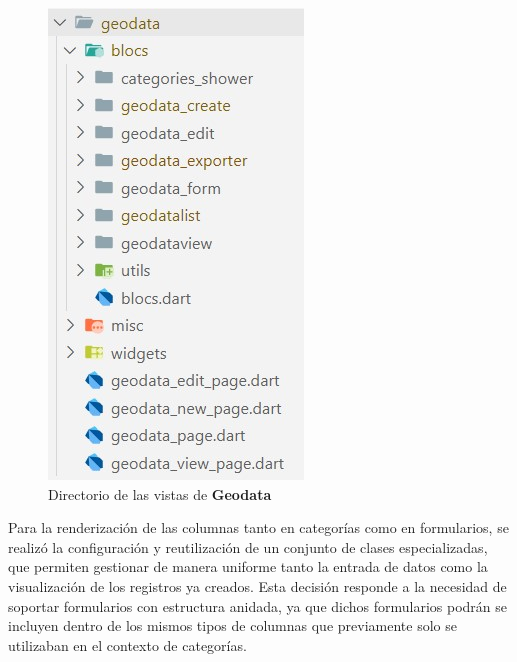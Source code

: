 \documentclass{article}
\begin{document}
\begin{figure}[H]
\begin{minipage}[b]{0.3\textwidth}
    \includegraphics[width=\textwidth]{images/goedata_page.jpg}
    \caption{Directorio de las vistas de \textbf{Geodata}}
    \label{fig:geodatapage}
  \end{minipage}
\end{figure}

Para la renderización de las columnas tanto en categorías como en formularios, se realizó la configuración y reutilización de un conjunto de clases especializadas, que permiten gestionar de manera uniforme tanto la entrada de datos como la visualización de los registros ya creados. Esta decisión responde a la necesidad de soportar formularios con estructura anidada, ya que dichos formularios podrán se incluyen dentro de los mismos tipos de columnas que previamente solo se utilizaban en el contexto de categorías.
\end{document}

